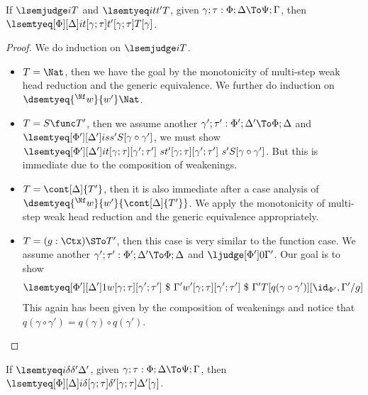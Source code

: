 \begin{lemma}[Monotonicity]
  If $\lsemjudge i T$ and $\lsemtyeq i {t}{t'} T$, given $\gamma; \tau : \Phi;\Delta
  \To \Psi; \Gamma$, then $\lsemtyeq[\Phi][\Delta] i
  {t[\gamma;\tau]}{t'[\gamma;\tau]}{T[\gamma]}$.
\end{lemma}
\begin{proof}
  We do induction on $\lsemjudge i T$.
  \begin{itemize}[label=Case]
  \item $T = \Nat$, then we have the goal by the monotonicity of multi-step weak head
    reduction and the generic equivalence. %
    We further do induction on $\dsemtyeq{^{\Nf} {w}}{w'} \Nat$.
    
  \item $T = S \func T'$, then we assume another $\gamma';\tau' : \Phi'; \Delta' \To
    \Phi; \Delta$ and $\lsemtyeq[\Phi'][\Delta'] i {s}{s'}{S[\gamma \circ
      \gamma']}$, we must show $\lsemtyeq[\Phi'][\Delta'] i {t[\gamma; \tau][\gamma'; \tau']~s}{t'[\gamma; \tau][\gamma'; \tau']~s'}{S[\gamma \circ
      \gamma']}$. %
    But this is immediate due to the composition of weakenings.
    
  \item $T = \cont[\Delta]{T'}$, then it is also immediate after a case analysis of
    $\dsemtyeq{^{\Nf} {w}}{w'}{\cont[\Delta]{T'}}$. %
    We apply the monotonicity of multi-step weak head
    reduction and the generic equivalence appropriately.
    
  \item $T = (g : \Ctx) \STo T'$, then this case is very similar to the function
    case. %
    We assume another $\gamma';\tau' : \Phi'; \Delta' \To
    \Phi; \Delta$ and $\ljudge[\Phi'] 0 \Gamma'$. %
    Our goal is to show
    \[
      \lsemtyeq[\Phi'][\Delta']
      1{w[\gamma;\tau][\gamma';\tau']~\$~\Gamma'}{w'[\gamma;\tau][\gamma';\tau']~\$~\Gamma'}{T[q(\gamma
        \circ \gamma')][\id_{\Phi'}, \Gamma'/g]}
    \]
    This again has been given by the composition of weakenings and notice that
    $q(\gamma \circ \gamma') = q(\gamma) \circ q(\gamma')$. 
  \end{itemize}
\end{proof}
\begin{lemma}[Monotonicity]
  If $\lsemtyeq i {\delta}{\delta'}{\Delta'}$, given $\gamma; \tau : \Phi;\Delta
  \To \Psi; \Gamma$, then $\lsemtyeq[\Phi][\Delta] i
  {\delta[\gamma;\tau]}{\delta'[\gamma;\tau]}{\Delta'[\gamma]}$.
\end{lemma}

